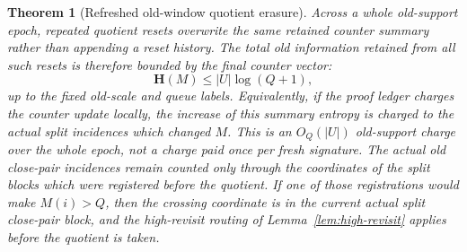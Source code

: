 \documentclass[11pt]{article}
\newtheorem{theorem}{Theorem}[section]
\newcommand{\bfH}{\mathbf H}
\begin{document}
\begin{theorem}[Refreshed old-window quotient erasure]
Across a whole old-support epoch, repeated quotient resets overwrite the same
retained counter summary rather than appending a reset history.  The total
old information retained from all such resets is therefore bounded by the final
counter vector:
\[
  \bfH(M)\le |U|\log(Q+1),
\]
up to the fixed old-scale and queue labels.  Equivalently, if the proof ledger
charges the counter update locally, the increase of this summary entropy is
charged to the actual split incidences which changed $M$.  This is an
$O_Q(|U|)$ old-support charge over the whole epoch, not a charge paid once per
fresh signature.  The actual old close-pair incidences remain counted only
through the coordinates of the split blocks which were registered before the
quotient.  If one of those registrations would make $M(i)>Q$, then the crossing
coordinate is in the current actual split close-pair block, and the
high-revisit routing of Lemma~\ref{lem:high-revisit} applies before the
quotient is taken.
\end{theorem}
\end{document}
